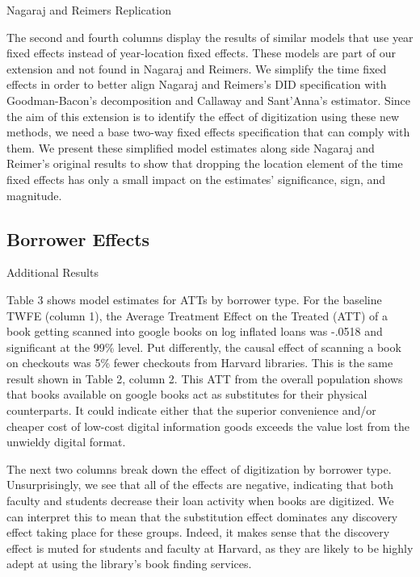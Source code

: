 \documentclass{article}
\begin{document}
\begin{table}[htbp]
   \centering
   \caption{Nagaraj and Reimers Replication}
  
   \label{tab:booktabs}
\end{table}

The second and fourth columns display the results of similar models that use year fixed effects instead of year-location fixed effects. These models are part of our extension and not found in Nagaraj and Reimers. We simplify the time fixed effects in order to better align Nagaraj and Reimers's DID specification with Goodman-Bacon's decomposition and Callaway and Sant'Anna's estimator. Since the aim of this extension is to identify the effect of digitization using these new methods, we need a base two-way fixed effects specification that can comply with them. We present these simplified model estimates along side Nagaraj and Reimer's original results to show that dropping the location element of the time fixed effects has only a small impact on the estimates' significance, sign, and magnitude.

\subsection{Borrower Effects}
\begin{table}[h]
   \centering
   \caption{Additional Results}
  
   \label{tab:booktabs}
\end{table}
Table 3 shows model estimates for ATTs by borrower type. For the baseline TWFE (column 1), the Average Treatment Effect on the Treated (ATT) of a book getting scanned into google books on log inflated loans was -.0518 and significant at the 99\% level. Put differently, the causal effect of scanning a book on checkouts was 5\% fewer checkouts from Harvard libraries. This is the same result shown in Table 2, column 2. This ATT from the overall population shows that books available on google books act as substitutes for their physical counterparts. It could indicate either that the superior convenience and/or cheaper cost of low-cost digital information goods exceeds the value lost from the unwieldy digital format. 

The next two columns break down the effect of digitization by borrower type. Unsurprisingly, we see that all of the effects are negative, indicating that both faculty and students decrease their loan activity when books are digitized. We can interpret this to mean that the substitution effect dominates any discovery effect taking place for these groups. Indeed, it makes sense that the discovery effect is muted for students and faculty at Harvard, as they are likely to be highly adept at using the library's book finding services. 
\end{document}
